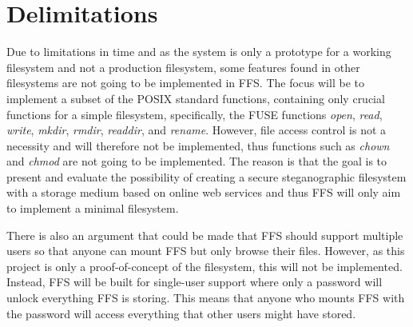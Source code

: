 \section{Delimitations} %

Due to limitations in time and as the system is only a prototype for a working filesystem and not a production filesystem, some features found in other filesystems are not going to be implemented in \gls{FFS}. The focus will be to implement a subset of the POSIX standard functions, containing only crucial functions for a simple filesystem, specifically, the \gls{FUSE} functions \textit{open}, \textit{read}, \textit{write}, \textit{mkdir}, \textit{rmdir}, \textit{readdir}, and \textit{rename}. However, file access control is not a necessity and will therefore not be implemented, thus functions such as \textit{chown} and \textit{chmod} are not going to be implemented. The reason is that the goal is to present and evaluate the possibility of creating a secure steganographic filesystem with a storage medium based on online web services and thus \gls{FFS} will only aim to implement a minimal filesystem. 

There is also an argument that could be made that \gls{FFS} should support multiple users so that anyone can mount \gls{FFS} but only browse their files. However, as this project is only a proof-of-concept of the filesystem, this will not be implemented. Instead, \gls{FFS} will be built for single-user support where only a password will unlock everything \gls{FFS} is storing. This means that anyone who mounts \gls{FFS} with the password will access everything that other users might have stored.

